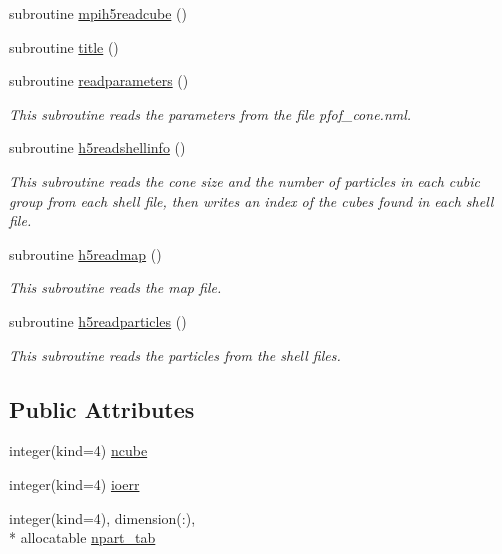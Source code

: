 \begin{DoxyCompactItemize}
subroutine \hyperlink{classmodio_a538e3b0c56f785106907880cb1e359b1}{mpih5readcube} ()
\item 
subroutine \hyperlink{classmodio_aefab9476e94da81a75351dbeee74e623}{title} ()
\item 
subroutine \hyperlink{classmodio_aa5e6b5f45cf8cfc091e8e7ff25a97c68}{readparameters} ()
\begin{DoxyCompactList}\small\item\em This subroutine reads the parameters from the file pfof\-\_\-cone.\-nml. \end{DoxyCompactList}\item 
subroutine \hyperlink{classmodio_a5f1cc94eaee9d1f4f7bdca4cb63ee5bc}{h5readshellinfo} ()
\begin{DoxyCompactList}\small\item\em This subroutine reads the cone size and the number of particles in each cubic group from each shell file, then writes an index of the cubes found in each shell file. \end{DoxyCompactList}\item 
subroutine \hyperlink{classmodio_a0d3522f20c353a57b002c3120bc266f2}{h5readmap} ()
\begin{DoxyCompactList}\small\item\em This subroutine reads the map file. \end{DoxyCompactList}\item 
subroutine \hyperlink{classmodio_a8f70f66bd5285c807b17e0c89a6e0e4a}{h5readparticles} ()
\begin{DoxyCompactList}\small\item\em This subroutine reads the particles from the shell files. \end{DoxyCompactList}\end{DoxyCompactItemize}
\subsection*{Public Attributes}
\begin{DoxyCompactItemize}
\item 
integer(kind=4) \hyperlink{classmodio_af7ac0e60c49f16bf08605237dd728508}{ncube}
\item 
integer(kind=4) \hyperlink{classmodio_a62b213d7b9f52071f903b877ee52c86b}{ioerr}
\item 
integer(kind=4), dimension(\-:), \\*
allocatable \hyperlink{classmodio_a0bb05c9005df17b314c2a7e0f43e758c}{npart\-\_\-tab}
\end{DoxyCompactItemize}


